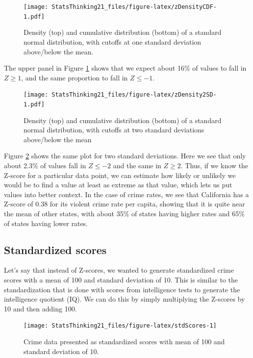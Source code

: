 \documentclass[12pt,]{book}
\theoremstyle{definition}
\theoremstyle{definition}
\theoremstyle{definition}
\theoremstyle{remark}
\begin{document}
\begin{figure}
\centering
\texttt{[image: StatsThinking21\_files/figure-latex/zDensityCDF-1.pdf]}
\caption{\label{fig:zDensityCDF}Density (top) and cumulative distribution (bottom) of a standard normal distribution, with cutoffs at one standard deviation above/below the mean.}
\end{figure}

The upper panel in Figure \ref{fig:zDensityCDF} shows that we expect about 16\% of values to fall in \(Z\ge 1\), and the same proportion to fall in \(Z\le -1\).

\begin{figure}
\centering
\texttt{[image: StatsThinking21\_files/figure-latex/zDensity2SD-1.pdf]}
\caption{\label{fig:zDensity2SD}Density (top) and cumulative distribution (bottom) of a standard normal distribution, with cutoffs at two standard deviations above/below the mean}
\end{figure}

Figure \ref{fig:zDensity2SD} shows the same plot for two standard deviations. Here we see that only about 2.3\% of values fall in \(Z \le -2\) and the same in \(Z \ge 2\). Thus, if we know the Z-score for a particular data point, we can estimate how likely or unlikely we would be to find a value at least as extreme as that value, which lets us put values into better context. In the case of crime rates, we see that California has a Z-score of 0.38 for its violent crime rate per capita, showing that it is quite near the mean of other states, with about 35\% of states having higher rates and 65\% of states having lower rates.

\hypertarget{standardized-scores}{%
\subsection{Standardized scores}\label{standardized-scores}}

Let's say that instead of Z-scores, we wanted to generate standardized crime scores with a mean of 100 and standard deviation of 10. This is similar to the standardization that is done with scores from intelligence tests to generate the intelligence quotient (IQ). We can do this by simply multiplying the Z-scores by 10 and then adding 100.

\begin{figure}
\texttt{[image: StatsThinking21\_files/figure-latex/stdScores-1]} \caption{Crime data presented as standardized scores with mean of  100 and standard deviation of 10.}\label{fig:stdScores}
\end{figure}
\end{document}
